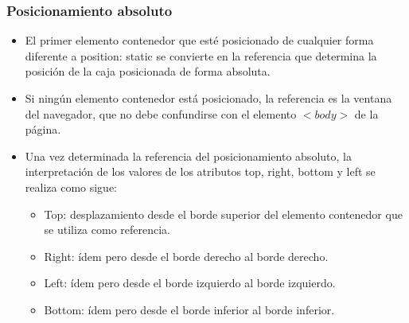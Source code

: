 \documentclass[ucs]{beamer}
\begin{document}

\begin{frame}
\frametitle{Posicionamiento absoluto}

\begin{itemize}
  \item El primer elemento contenedor que esté posicionado de cualquier forma diferente a position: static se convierte en la referencia que determina la posición de la caja posicionada de forma absoluta.
  \item Si ningún elemento contenedor está posicionado, la referencia es la ventana del navegador, que no debe confundirse con el elemento $<body>$ de la página.
  \item Una vez determinada la referencia del posicionamiento absoluto, la interpretación de los valores de los atributos top, right, bottom y left se realiza como sigue:
  \begin{itemize}
    \item Top: desplazamiento desde el borde superior del elemento contenedor que se utiliza como referencia.
    \item Right: ídem pero desde el borde derecho al borde derecho.
    \item Left:  ídem pero desde el borde izquierdo al borde izquierdo.
    \item Bottom: ídem pero desde el borde inferior al borde inferior.
  \end{itemize}
\end{itemize}

\end{frame}


\end{document}

